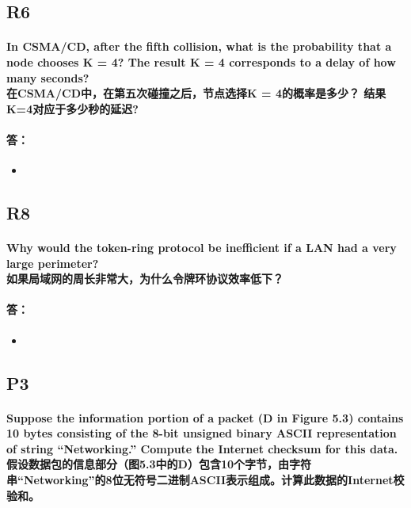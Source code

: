 \documentclass[a4paper]{ctexart}
\begin{document}
\subsection*{R6}
\paragraph*{In CSMA/CD, after the fifth collision, what is the probability that a node chooses K = 4? The result K = 4 corresponds to a delay of how many seconds?\\
在CSMA/CD中，在第五次碰撞之后，节点选择K = 4的概率是多少？ 结果K=4对应于多少秒的延迟?}
\paragraph*{答：} 
\begin{itemize}
    \item 
\end{itemize}

\subsection*{R8}
\paragraph*{Why would the token-ring protocol be inefficient if a LAN had a very large perimeter?\\
如果局域网的周长非常大，为什么令牌环协议效率低下？}
\paragraph*{答：} 
\begin{itemize}
    \item 
\end{itemize}

\subsection*{P3}
\paragraph*{Suppose the information portion of a packet (D in Figure 5.3) contains 10 bytes consisting of the 8-bit unsigned binary ASCII representation of string “Networking.” Compute the Internet checksum for this data. \\
假设数据包的信息部分（图5.3中的D）包含10个字节，由字符串“Networking”的8位无符号二进制ASCII表示组成。计算此数据的Internet校验和。}
\end{document}
